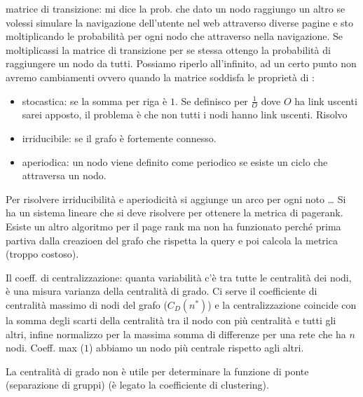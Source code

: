 \begin{itemize}
    matrice di transizione: mi dice la prob. che dato un nodo raggiungo un altro
    se volessi simulare la navigazione dell'utente nel web attraverso diverse pagine
    e sto moltiplicando le probabilità per ogni nodo che attraverso nella navigazione.
    Se moltiplicassi la matrice di transizione per se stessa ottengo la probabilità 
    di raggiungere un nodo da tutti. Possiamo riperlo all'infinito, ad un certo punto 
    non avremo cambiamenti ovvero quando la matrice soddisfa le proprietà di :
    \begin{itemize}
        \item stocastica: se la somma per riga è $1$. Se definisco per $\frac{1}{O}$ 
        dove $O$ ha link uscenti sarei apposto, il problema è che non tutti i nodi 
        hanno link uscenti. Risolvo %
        \item irriducibile: se il grafo è fortemente connesso.
        \item aperiodica: un nodo viene definito come periodico se esiste un 
        ciclo che attraversa un nodo. 
    \end{itemize} 
    Per risolvere irriducibilità e aperiodicità si aggiunge un arco per ogni noto \dots
    Si ha un sistema lineare che si deve risolvere per ottenere la metrica 
    di pagerank.
    Esiste un altro algoritmo per il page rank ma non ha funzionato perché prima 
    partiva dalla creazioen del grafo che rispetta la query e poi calcola la metrica
    (troppo costoso).
\end{itemize}

Il coeff. di centralizzazione: quanta variabilità c'è tra tutte le centralità dei 
nodi, è una misura varianza della centralità di grado. Ci serve il coefficiente 
di centralità massimo di nodi del grafo ($C_D(n^\ast)$) e la centralizzazione coincide 
con la somma degli scarti della centralità tra il nodo con più centralità e tutti gli altri,
infine normalizzo per la massima somma di differenze per una rete che ha $n$ nodi.
Coeff. max ($1$) abbiamo un nodo più centrale rispetto agli altri. 

La centralità di grado non è utile per determinare la funzione di ponte (separazione 
di gruppi) (è legato la coefficiente di clustering).


